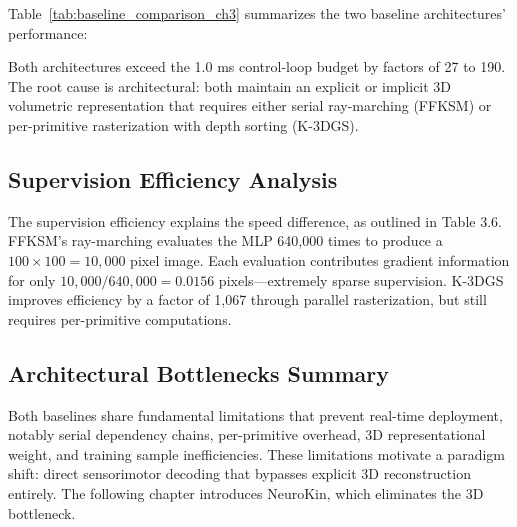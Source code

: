 \documentclass[12pt,a4paper,oneside]{report}
\begin{document}
Table~\ref{tab:baseline_comparison_ch3} summarizes the two baseline architectures' performance:

\begin{table}[H]
\centering
\caption{Baseline self-modeling architecture performance comparison.}
\label{tab:baseline_comparison_ch3}
\end{table}

Both architectures exceed the 1.0 ms control-loop budget by factors of 27 to 190. The root cause is architectural: both maintain an explicit or implicit 3D volumetric representation that requires either serial ray-marching (FFKSM) or per-primitive rasterization with depth sorting (K-3DGS).

\subsection{Supervision Efficiency Analysis}

The supervision efficiency explains the speed difference, as outlined in Table 3.6. FFKSM's ray-marching evaluates the MLP 640,000 times to produce a $100 \times 100 = 10,000$ pixel image. Each evaluation contributes gradient information for only $10,000 / 640,000 = 0.0156$ pixels---extremely sparse supervision. K-3DGS improves efficiency by a factor of 1,067 through parallel rasterization, but still requires per-primitive computations.

\subsection{Architectural Bottlenecks Summary}

Both baselines share fundamental limitations that prevent real-time deployment, notably serial dependency chains, per-primitive overhead, 3D representational weight, and training sample inefficiencies. These limitations motivate a paradigm shift: direct sensorimotor decoding that bypasses explicit 3D reconstruction entirely. The following chapter introduces NeuroKin, which eliminates the 3D bottleneck.
\end{document}
